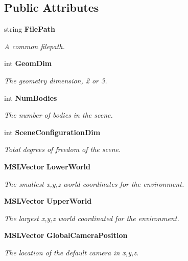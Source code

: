 \subsection*{Public Attributes}
\begin{CompactItemize}
\item 
string {\bf File\-Path}
\begin{CompactList}\small\item\em A common filepath.\item\end{CompactList}\item 
int {\bf Geom\-Dim}
\begin{CompactList}\small\item\em The geometry dimension, 2 or 3.\item\end{CompactList}\item 
int {\bf Num\-Bodies}
\begin{CompactList}\small\item\em The number of bodies in the scene.\item\end{CompactList}\item 
int {\bf Scene\-Configuration\-Dim}
\begin{CompactList}\small\item\em Total degrees of freedom of the scene.\item\end{CompactList}\item 
{\bf MSLVector} {\bf Lower\-World}
\begin{CompactList}\small\item\em The smallest x,y,z world coordinates for the environment.\item\end{CompactList}\item 
{\bf MSLVector} {\bf Upper\-World}
\begin{CompactList}\small\item\em The largest x,y,z world coordinated for the environment.\item\end{CompactList}\item 
{\bf MSLVector} {\bf Global\-Camera\-Position}
\begin{CompactList}\small\item\em The location of the default camera in x,y,z.\item\end{CompactList}\item 

\end{CompactItemize}
